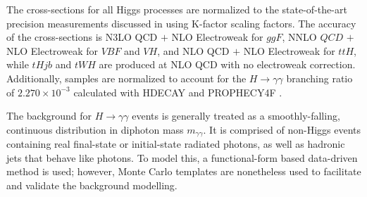 The cross-sections for all Higgs processes are normalized to the state-of-the-art precision measurements discussed in \cite{YellowReport4} using K-factor scaling factors. The accuracy of the cross-sections is N3LO QCD $+$ NLO Electroweak for $ggF$, NNLO $QCD$ $+$ NLO Electroweak for $VBF$ and $VH$, and NLO QCD $+$ NLO Electroweak for $ttH$, while $tHjb$ and $tWH$ are produced at NLO QCD with no electroweak correction. Additionally, samples are normalized to account for the $H \rightarrow \gamma \gamma$ branching ratio of $2.270 \times 10^{-3}$ calculated with HDECAY \cite{HDecay1} \cite{HDecay2} \cite{HDecay3} and PROPHECY4F \cite{Prophecy1} \cite{Prophecy2} \cite{Prophecy3}.

\begin{table}[h!]
  \centering
  \caption{Cross sections times branching ratio values used to normalize each production mode. The values correspond to the state-of-the-art predictions and are taken from the CERN Yellow Report \cite{YellowReport4}.}
  \label{tab:signal_samples_norm}
\end{table}  

The background for $H \rightarrow \gamma \gamma$ events is generally treated as a smoothly-falling, continuous distribution in diphoton mass $m_{\gamma \gamma}$. It is comprised of non-Higgs events containing real final-state or initial-state radiated photons, as well as hadronic jets that behave like photons. To model this, a functional-form based data-driven method is used; however, Monte Carlo templates are nonetheless used to facilitate and validate the background modelling.


